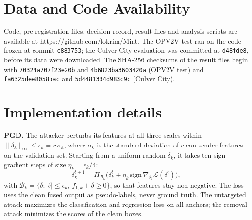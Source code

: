 \documentclass[conference]{IEEEtran}
\begin{document}
\section*{Data and Code Availability}
Code, pre-registration files, decision record, result files and analysis scripts are available at
\url{https://github.com/lokrim/Mint}. The OPV2V test ran on the code frozen at commit \texttt{c883753}; the Culver
City evaluation was committed at \texttt{d48fde8}, before its data were downloaded. The SHA-256 checksums of the
result files begin with \texttt{70324a707f23e20b} and \texttt{4b6823ba3603420a} (OPV2V test) and
\texttt{fa6325dee8058bac} and \texttt{5d4481334d983c9c} (Culver City).




\clearpage
\appendices

\section{Implementation details}
\label{app:impl}
\textbf{PGD.} The attacker perturbs its features at all three scales within
$\|\delta_k\|_\infty\le\epsilon_k=r\,\sigma_k$, where $\sigma_k$ is the standard deviation of clean sender
features on the validation set. Starting from a uniform random $\delta_k$, it takes ten sign-gradient steps of size
$\eta_k=\epsilon_k/4$:
\begin{equation}
\delta_k^{t+1}=\Pi_{\mathcal{B}_k}\!\big(\delta_k^{t}+\eta_k\,\mathrm{sign}\,\nabla_{\delta_k}\mathcal{L}(\delta^{t})\big),
\label{eq:pgd}
\end{equation}
with $\mathcal{B}_k=\{\delta:|\delta|\le\epsilon_k,\ f_{1,k}+\delta\ge 0\}$, so that features stay non-negative.
The loss uses the clean fused output as pseudo-labels, never ground truth. The untargeted attack maximizes the
classification and regression loss on all anchors; the removal attack minimizes the scores of the clean boxes.
\end{document}
